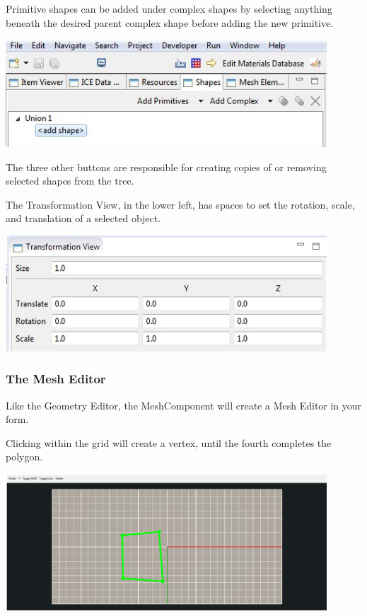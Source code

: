 \documentclass{article}
\begin{document}
Primitive shapes can be added under complex shapes by selecting anything beneath
the desired parent complex shape before adding the new primitive.

\begin{center}
\includegraphics[width=12cm]{images/ComplexShapeTree}
\end{center}

The three other buttons are responsible for creating copies of or removing
selected shapes from the tree. 

The Transformation View, in the lower left, has spaces to set the rotation, scale, 
and translation of a selected object.

\begin{center}
\includegraphics[width=12cm]{images/TransformationView}
\end{center}

\subsubsection{The Mesh Editor}

Like the Geometry Editor, the MeshComponent will create a Mesh Editor in your
form.

Clicking within the grid will create a vertex, until the fourth completes the
polygon.

\begin{center}
\includegraphics[width=12cm]{images/AddPolygon}
\end{center}
\end{document}
